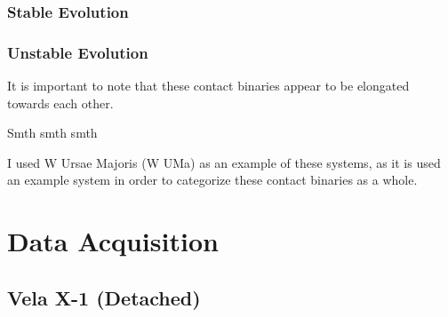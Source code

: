 \documentclass[12pt, letterpaper]{article}
\begin{document}
        \subsubsection{Stable Evolution}

        \subsubsection{Unstable Evolution}
        It is important to note that these contact binaries appear to be elongated towards each other. 

        Smth smth smth

        I used W Ursae Majoris (W UMa) as an example of these systems, as it is used an example system in order to categorize these contact binaries as a whole.

        
\section{\centering Data Acquisition}
    \subsection{\centering Vela X-1 (Detached)}
    
\end{document}

